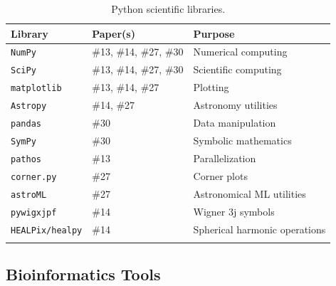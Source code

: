 \documentclass[11pt,letterpaper]{article}
\newcommand{\tool}[1]{\texttt{#1}}
\begin{document}
\begin{longtable}{l l p{6.5cm}}
\toprule
\textbf{Library} & \textbf{Paper(s)} & \textbf{Purpose} \\
\midrule
\tool{NumPy}       & \#13, \#14, \#27, \#30 & Numerical computing \\
\tool{SciPy}       & \#13, \#14, \#27, \#30 & Scientific computing \\
\tool{matplotlib}  & \#13, \#14, \#27       & Plotting \\
\tool{Astropy}     & \#14, \#27             & Astronomy utilities \\
\tool{pandas}      & \#30                   & Data manipulation \\
\tool{SymPy}       & \#30                   & Symbolic mathematics \\
\tool{pathos}      & \#13                   & Parallelization \\
\tool{corner.py}   & \#27                   & Corner plots \\
\tool{astroML}     & \#27                   & Astronomical ML utilities \\
\tool{pywigxjpf}   & \#14                   & Wigner 3j symbols \\
\tool{HEALPix/healpy} & \#14               & Spherical harmonic operations \\
\bottomrule
\caption{Python scientific libraries.}
\end{longtable}

\subsection{Bioinformatics Tools}
\end{document}
